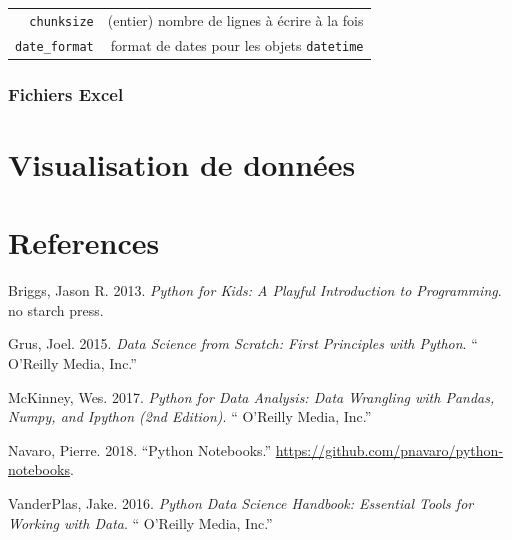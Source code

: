 \documentclass[12pt,]{book}
\numberwithin{equation}{section}
\numberwithin{countremarque}{section}
\begin{document}
\begin{longtable}[]{@{}rr@{}}
\begin{minipage}[t]{0.22\columnwidth}
\texttt{chunksize}\strut
\end{minipage} & \begin{minipage}[t]{0.67\columnwidth}\raggedleft\strut
(entier) nombre de lignes à écrire à la fois\strut
\end{minipage}\tabularnewline
\begin{minipage}[t]{0.22\columnwidth}\raggedleft\strut
\texttt{date\_format}\strut
\end{minipage} & \begin{minipage}[t]{0.67\columnwidth}\raggedleft\strut
format de dates pour les objets \texttt{datetime}\strut
\end{minipage}\tabularnewline
\bottomrule
\end{longtable}

\subsection{Fichiers Excel}\label{pandas-importation-excel}

\chapter{Visualisation de données}\label{visualisation-de-donnees}

\chapter{References}\label{references}

\hypertarget{refs}{}
\hypertarget{ref-briggs_2013_python}{}
Briggs, Jason R. 2013. \emph{Python for Kids: A Playful Introduction to
Programming}. no starch press.

\hypertarget{ref-grus_2015_data}{}
Grus, Joel. 2015. \emph{Data Science from Scratch: First Principles with
Python}. `` O'Reilly Media, Inc.''

\hypertarget{ref-mckinney_2017_python}{}
McKinney, Wes. 2017. \emph{Python for Data Analysis: Data Wrangling with
Pandas, Numpy, and Ipython (2nd Edition)}. `` O'Reilly Media, Inc.''

\hypertarget{ref-navaro_python}{}
Navaro, Pierre. 2018. ``Python Notebooks.''
\url{https://github.com/pnavaro/python-notebooks}.

\hypertarget{ref-vanderplas2016python}{}
VanderPlas, Jake. 2016. \emph{Python Data Science Handbook: Essential
Tools for Working with Data}. `` O'Reilly Media, Inc.''
\end{document}
